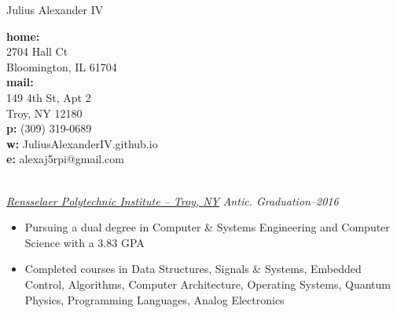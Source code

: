 \documentclass[11pt]{article} %
\begin{document}
\title{}
\centerline{ {\Huge \sc Julius Alexander IV} }

\begin{multicols}{3}
\noindent \textbf{home:} \\
2704 Hall Ct \\
Bloomington, IL 61704 \\

\noindent \textbf{mail:} \\
149 4th St, Apt 2 \\
Troy, NY 12180 \\

\noindent \textbf{p:} (309) 319-0689 \\
\noindent \textbf{w:} JuliusAlexanderIV.github.io \\
\noindent \textbf{e:} alexaj5rpi@gmail.com
\end{multicols}


 \hrulefill\\
\noindent
\underline{\textit{Rensselaer Polytechnic Institute -- Troy, NY}} \hfill \textit{Antic. Graduation--2016}

\begin{itemize}[noitemsep]
\renewcommand\labelitemi{$\blacktriangleright$}

\item Pursuing a dual degree in Computer \& Systems Engineering and Computer Science with a 3.83 GPA
\item Completed courses in Data Structures, Signals \& Systems, Embedded Control, Algorithms, Computer Architecture, Operating Systems, Quantum Physics, Programming Languages, Analog Electronics
\end{itemize}

\end{document}
